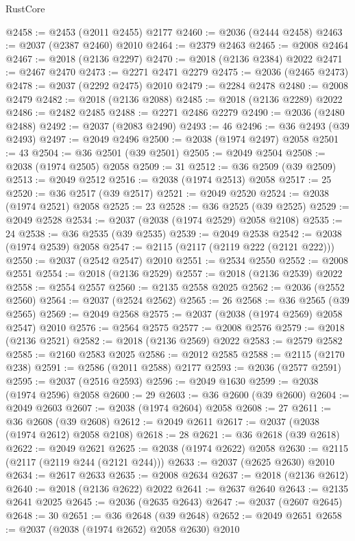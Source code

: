 \begin{lexlean}{RustCore}
\begin{coremodule}
@2458 := @2453 (@2011 @2455) @2177
@2460 := @2036 (@2444 @2458)
@2463 := @2037 (@2387 @2460) @2010
@2464 := @2379 @2463
@2465 := @2008 @2464
@2467 := @2018 (@2136 @2297)
@2470 := @2018 (@2136 @2384) @2022
@2471 := @2467 @2470
@2473 := @2271 @2471 @2279
@2475 := @2036 (@2465 @2473)
@2478 := @2037 (@2292 @2475) @2010
@2479 := @2284 @2478
@2480 := @2008 @2479
@2482 := @2018 (@2136 @2088)
@2485 := @2018 (@2136 @2289) @2022
@2486 := @2482 @2485
@2488 := @2271 @2486 @2279
@2490 := @2036 (@2480 @2488)
@2492 := @2037 (@2083 @2490)
@2493 := 46
@2496 := @36 @2493 (@39 @2493)
@2497 := @2049 @2496
@2500 := @2038 (@1974 @2497) @2058
@2501 := 43
@2504 := @36 @2501 (@39 @2501)
@2505 := @2049 @2504
@2508 := @2038 (@1974 @2505) @2058
@2509 := 31
@2512 := @36 @2509 (@39 @2509)
@2513 := @2049 @2512
@2516 := @2038 (@1974 @2513) @2058
@2517 := 25
@2520 := @36 @2517 (@39 @2517)
@2521 := @2049 @2520
@2524 := @2038 (@1974 @2521) @2058
@2525 := 23
@2528 := @36 @2525 (@39 @2525)
@2529 := @2049 @2528
@2534 := @2037 (@2038 (@1974 @2529) @2058 @2108)
@2535 := 24
@2538 := @36 @2535 (@39 @2535)
@2539 := @2049 @2538
@2542 := @2038 (@1974 @2539) @2058
@2547 := @2115 (@2117 (@2119 @222 (@2121 @222)))
@2550 := @2037 (@2542 @2547) @2010
@2551 := @2534 @2550
@2552 := @2008 @2551
@2554 := @2018 (@2136 @2529)
@2557 := @2018 (@2136 @2539) @2022
@2558 := @2554 @2557
@2560 := @2135 @2558 @2025
@2562 := @2036 (@2552 @2560)
@2564 := @2037 (@2524 @2562)
@2565 := 26
@2568 := @36 @2565 (@39 @2565)
@2569 := @2049 @2568
@2575 := @2037 (@2038 (@1974 @2569) @2058 @2547) @2010
@2576 := @2564 @2575
@2577 := @2008 @2576
@2579 := @2018 (@2136 @2521)
@2582 := @2018 (@2136 @2569) @2022
@2583 := @2579 @2582
@2585 := @2160 @2583 @2025
@2586 := @2012 @2585
@2588 := @2115 (@2170 @238)
@2591 := @2586 (@2011 @2588) @2177
@2593 := @2036 (@2577 @2591)
@2595 := @2037 (@2516 @2593)
@2596 := @2049 @1630
@2599 := @2038 (@1974 @2596) @2058
@2600 := 29
@2603 := @36 @2600 (@39 @2600)
@2604 := @2049 @2603
@2607 := @2038 (@1974 @2604) @2058
@2608 := 27
@2611 := @36 @2608 (@39 @2608)
@2612 := @2049 @2611
@2617 := @2037 (@2038 (@1974 @2612) @2058 @2108)
@2618 := 28
@2621 := @36 @2618 (@39 @2618)
@2622 := @2049 @2621
@2625 := @2038 (@1974 @2622) @2058
@2630 := @2115 (@2117 (@2119 @244 (@2121 @244)))
@2633 := @2037 (@2625 @2630) @2010
@2634 := @2617 @2633
@2635 := @2008 @2634
@2637 := @2018 (@2136 @2612)
@2640 := @2018 (@2136 @2622) @2022
@2641 := @2637 @2640
@2643 := @2135 @2641 @2025
@2645 := @2036 (@2635 @2643)
@2647 := @2037 (@2607 @2645)
@2648 := 30
@2651 := @36 @2648 (@39 @2648)
@2652 := @2049 @2651
@2658 := @2037 (@2038 (@1974 @2652) @2058 @2630) @2010

\end{coremodule}
\end{lexlean}
